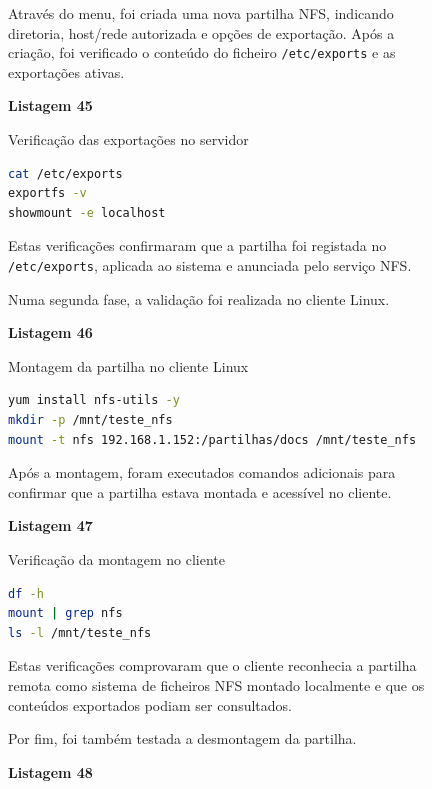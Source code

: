 \begin{figure}[H]
Atrav\'es do menu, foi criada uma nova partilha NFS, indicando diretoria, host/rede autorizada e op\c{c}\~oes de exporta\c{c}\~ao. Ap\'os a cria\c{c}\~ao, foi verificado o conte\'udo do ficheiro \texttt{/etc/exports} e as exporta\c{c}\~oes ativas.

\textbf{Listagem 45}

Verifica\c{c}\~ao das exporta\c{c}\~oes no servidor

\begin{lstlisting}[language=bash,breaklines=true,basicstyle=\ttfamily\small,columns=fullflexible,keepspaces=true,showstringspaces=false]
cat /etc/exports
exportfs -v
showmount -e localhost
\end{lstlisting}

Estas verifica\c{c}\~oes confirmaram que a partilha foi registada no \texttt{/etc/exports}, aplicada ao sistema e anunciada pelo servi\c{c}o NFS.

Numa segunda fase, a valida\c{c}\~ao foi realizada no cliente Linux.

\textbf{Listagem 46}

Montagem da partilha no cliente Linux

\begin{lstlisting}[language=bash,breaklines=true,basicstyle=\ttfamily\small,columns=fullflexible,keepspaces=true,showstringspaces=false]
yum install nfs-utils -y
mkdir -p /mnt/teste_nfs
mount -t nfs 192.168.1.152:/partilhas/docs /mnt/teste_nfs
\end{lstlisting}

Ap\'os a montagem, foram executados comandos adicionais para confirmar que a partilha estava montada e acess\'ivel no cliente.

\textbf{Listagem 47}

Verifica\c{c}\~ao da montagem no cliente

\begin{lstlisting}[language=bash,breaklines=true,basicstyle=\ttfamily\small,columns=fullflexible,keepspaces=true,showstringspaces=false]
df -h
mount | grep nfs
ls -l /mnt/teste_nfs
\end{lstlisting}

Estas verifica\c{c}\~oes comprovaram que o cliente reconhecia a partilha remota como sistema de ficheiros NFS montado localmente e que os conte\'udos exportados podiam ser consultados.

Por fim, foi tamb\'em testada a desmontagem da partilha.

\textbf{Listagem 48}


\end{figure}
